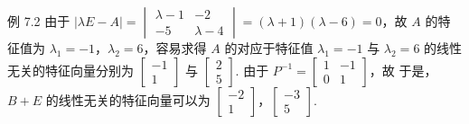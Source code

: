 \begin{fcard}{例 7.2}
由于 $|\lambda E-A|=\begin{vmatrix}\lambda-1&-2\\-5&\lambda-4\end{vmatrix}=(\lambda+1)(\lambda-6)=0$，故 $A$ 的特征值为 $\lambda_1=-1$，$\lambda_2=6$，容易求得 $A$ 的对应于特征值 $\lambda_1=-1$ 与 $\lambda_2=6$ 的线性无关的特征向量分别为 $\begin{bmatrix}-1\\1\end{bmatrix}$ 与 $\begin{bmatrix}2\\5\end{bmatrix}$. 由于 $P^{-1}=\begin{bmatrix}1&-1\\0&1\end{bmatrix}$，故
于是，$B+E$ 的线性无关的特征向量可以为 $\begin{bmatrix}-2\\1\end{bmatrix}$，$\begin{bmatrix}-3\\5\end{bmatrix}$.
\end{fcard}


